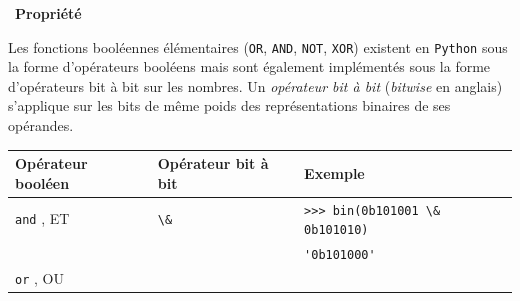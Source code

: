\documentclass[
  11pt,
]{article}
\newcommand{\passthrough}[1]{#1}
\newcounter{prop}
\newenvironment{propriete}[1]
{\par \medskip   \addtocounter{prop}{1} \noindent  
\begin{bclogo}[arrondi =0.1,  ombre = true, barre=none, logo=\bcbook, marge=4]{~\textbf{Propriété} \textbf{\theprop} {\itshape #1} }   \par}
{
\end{bclogo}
 \par \bigskip }
\begin{document}
\begin{propriete}{}

Les fonctions booléennes élémentaires (\passthrough{\lstinline!OR!},
\passthrough{\lstinline!AND!}, \passthrough{\lstinline!NOT!},
\passthrough{\lstinline!XOR!}) existent en
\passthrough{\lstinline!Python!} sous la forme d'opérateurs booléens
mais sont également implémentés sous la forme d'opérateurs bit à bit sur
les nombres. Un \emph{opérateur bit à bit} (\emph{bitwise} en anglais)
s'applique sur les bits de même poids des représentations binaires de
ses opérandes.

\begin{longtable}[]{@{}lll@{}}
\toprule
\begin{minipage}[b]{0.24\columnwidth}\raggedright
Opérateur booléen\strut
\end{minipage} & \begin{minipage}[b]{0.22\columnwidth}\raggedright
Opérateur bit à bit\strut
\end{minipage} & \begin{minipage}[b]{0.46\columnwidth}\raggedright
Exemple\strut
\end{minipage}\tabularnewline
\midrule
\endhead
\begin{minipage}[t]{0.24\columnwidth}\raggedright
\passthrough{\lstinline!and!} , ET\strut
\end{minipage} & \begin{minipage}[t]{0.22\columnwidth}\raggedright
\passthrough{\lstinline!\&!}\strut
\end{minipage} & \begin{minipage}[t]{0.46\columnwidth}\raggedright
\passthrough{\lstinline!>>> bin(0b101001 \& 0b101010)!}\strut
\end{minipage}\tabularnewline
\begin{minipage}[t]{0.24\columnwidth}\raggedright
\strut
\end{minipage} & \begin{minipage}[t]{0.22\columnwidth}\raggedright
\strut
\end{minipage} & \begin{minipage}[t]{0.46\columnwidth}\raggedright
\passthrough{\lstinline!'0b101000'!}\strut
\end{minipage}\tabularnewline
\begin{minipage}[t]{0.24\columnwidth}\raggedright
\passthrough{\lstinline!or!} , OU\strut
\end{minipage} & \begin{minipage}[t]{0.22\columnwidth}\raggedright

\end{minipage}
\end{longtable}
\end{propriete}
\end{document}
